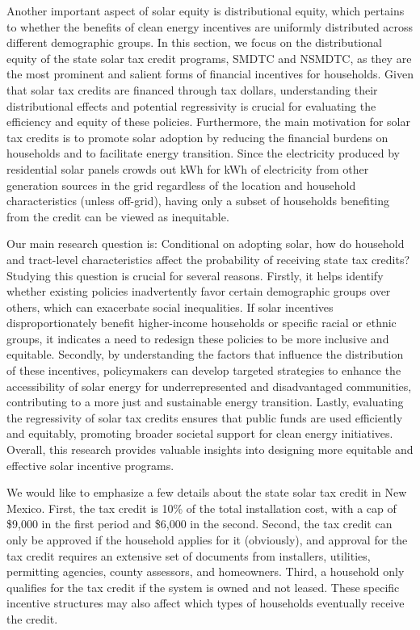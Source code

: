\documentclass[11pt,twoside,letterpaper]{article}
\begin{document}
Another important aspect of solar equity is distributional equity, which pertains to whether the benefits of clean energy incentives are uniformly distributed across different demographic groups. In this section, we focus on the distributional equity of the state solar tax credit programs, SMDTC and NSMDTC, as they are the most prominent and salient forms of financial incentives for households. Given that solar tax credits are financed through tax dollars, understanding their distributional effects and potential regressivity is crucial for evaluating the efficiency and equity of these policies. Furthermore, the main motivation for solar tax credits is to promote solar adoption by reducing the financial burdens on households and to facilitate energy transition. Since the electricity produced by residential solar panels crowds out kWh for kWh of electricity from other generation sources in the grid regardless of the location and household characteristics (unless off-grid), having only a subset of households benefiting from the credit can be viewed as inequitable.

Our main research question is: Conditional on adopting solar, how do household and tract-level characteristics affect the probability of receiving state tax credits? Studying this question is crucial for several reasons. Firstly, it helps identify whether existing policies inadvertently favor certain demographic groups over others, which can exacerbate social inequalities. If solar incentives disproportionately benefit higher-income households or specific racial or ethnic groups, it indicates a need to redesign these policies to be more inclusive and equitable. Secondly, by understanding the factors that influence the distribution of these incentives, policymakers can develop targeted strategies to enhance the accessibility of solar energy for underrepresented and disadvantaged communities, contributing to a more just and sustainable energy transition. Lastly, evaluating the regressivity of solar tax credits ensures that public funds are used efficiently and equitably, promoting broader societal support for clean energy initiatives. Overall, this research provides valuable insights into designing more equitable and effective solar incentive programs.

We would like to emphasize a few details about the state solar tax credit in New Mexico. First, the tax credit is 10\% of the total installation cost, with a cap of \$9,000 in the first period and \$6,000 in the second. Second, the tax credit can only be approved if the household applies for it (obviously), and approval for the tax credit requires an extensive set of documents from installers, utilities, permitting agencies, county assessors, and homeowners. Third, a household only qualifies for the tax credit if the system is owned and not leased. These specific incentive structures may also affect which types of households eventually receive the credit.
\end{document}
